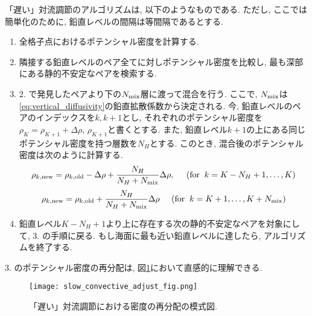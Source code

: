  「遅い」対流調節のアルゴリズムは, 以下のようなものである.
 ただし, ここでは簡単化のために, 鉛直レベルの間隔は等間隔であるとする.
 \begin{enumerate}
  \item 全格子点におけるポテンシャル密度を計算する.
  \item 隣接する鉛直レベルのペア全てに対しポテンシャル密度を比較し, 最も深部にある静的不安定なペアを検索する. 
  \item 2. で発見したペアより下の$N_{\rm mix}$層に渡って混合を行う. ここで, $N_{\rm mix}$は\eqref{eq:vertical_diffusivity}の鉛直拡散係数から決定される. 今, 鉛直レベルのペアのインデックスを$k,k+1$とし, それぞれのポテンシャル密度を$\rho_{K}=\rho_{K+1} + \Delta \rho$, $\rho_{K+1}$と書くとする. また, 鉛直レベル$k+1$の上にある同じポテンシャル密度を持つ層数を$N_H$とする. このとき, 混合後のポテンシャル密度は次のように計算する.
  \begin{equation}
   \rho_{k,{\rm new}} = \rho_{k,{\rm old}} - \Delta \rho + \dfrac{N_H}{N_H + N_{\rm mix}}\Delta \rho, \;\;\;\;\;
    ({\rm for} \;\; k=K-N_H+1, \dots, K)
  \end{equation}
  \begin{equation}
   \rho_{k,{\rm new}} = \rho_{k,{\rm old}} + \dfrac{N_H}{N_H + N_{\rm mix}}\Delta \rho \;\;\;\;\;
    ({\rm for} \;\; k=K+1, \dots, K+N_{\rm mix})
  \end{equation}
 \item 鉛直レベル$K-N_H+1$より上に存在する次の静的不安定なペアを対象にして, 3. の手順に戻る. もし海面に最も近い鉛直レベルに達したら, アルゴリズムを終了する.
 \end{enumerate}
3. のポテンシャル密度の再分配は, 図\ref{fig:SlowConvAdjustFig}において直感的に理解できる. 

 \begin{figure}
  \begin{center}
   \texttt{[image: slow\_convective\_adjust\_fig.png]}
   \caption{「遅い」対流調節における密度の再分配の模式図. }
   \label{fig:SlowConvAdjustFig}
  \end{center}
 \end{figure}
